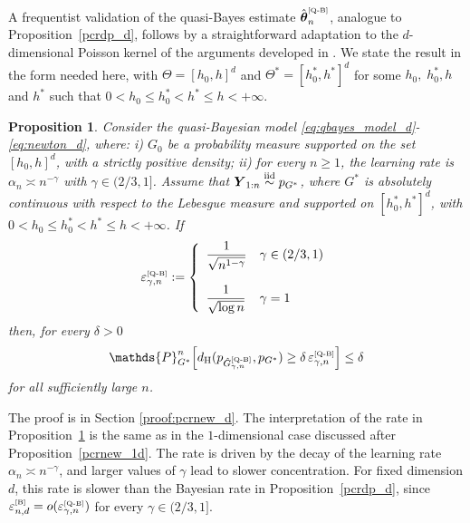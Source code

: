 \documentclass[twoside,12pt]{article}
\def\simiid{\stackrel{\mbox{\scriptsize{iid}}}{\sim}}
\renewcommand{\P}{\mathds{P}}
\newtheorem{prp}[thm]{Proposition}
\begin{document}
A frequentist validation of the quasi-Bayes estimate \(\hat{\boldsymbol\theta}^{\text{\tiny{[Q-B]}}}_{n}\), analogue to Proposition~\ref{pcrdp_d}, follows by a straightforward adaptation to the $d$-dimensional Poisson kernel of the arguments developed in  \citet[{Theorem 4.8 and }Corollary 4.10]{MarTok(09)}.  We state the result in the form needed here, with $\Theta=[{h_0},h]^d$ and $\Theta^{\ast}=[{h_0^\ast},h^{\ast}]^d$ for some ${h_0,\;h_0^\ast,h}$ and $h^{\ast}$ such that  $0<h_0\leq h_0^*<h^\ast\leq h<+\infty$.


\begin{prp}\label{pcrnew_d}
Consider the quasi-Bayesian model \eqref{eq:qbayes_model_d}-\eqref{eq:newton_d}, where: i) $G_0$ be a probability measure supported on the set $[h_0,h]^d$, with a strictly positive density; ii) for every $n\geq 1$, the learning rate is $\alpha_n\asymp n^{-\gamma}$ with $\gamma\in(2/3,1]$. Assume that $\boldsymbol{Y}_{1:n}\simiid p_{G^\ast}$, where $G^{\ast}$  is absolutely continuous with respect to the Lebesgue measure and supported on $[h_0^\ast,h^\ast]^d$, with $0<h_0\leq h_0^\ast<h^\ast\leq h<+\infty$. If
\begin{displaymath}
\varepsilon_{\gamma,n}^{\text{\tiny{[Q-B]}}}:=\left\{
\begin{array}{ll}
\dfrac{1}{\sqrt{n^{1-\gamma}}} &\gamma \in (2/3,1)\\
\\
\dfrac{1}{\sqrt{\log n}}&\gamma=1
\end{array}
\right.
\end{displaymath}
then, for every $\delta>0$
\begin{equation}\label{pcr_newton}
\P_{G^\ast}^n\!\left[d_{\mathrm H}(p_{\hat{G}_{\gamma,n}^{\text{\tiny{[Q-B]}}}},p_{G^\ast})\ge \delta\, \varepsilon_{\gamma,n}^{\text{\tiny{[Q-B]}}}\right]\le\delta
\end{equation}
for all sufficiently large $n$.
\end{prp}


The proof is in Section \ref{proof:pcrnew_d}. The interpretation of the rate in Proposition~\ref{pcrnew_d} is the same as in the $1$-dimensional case discussed after Proposition~\ref{pcrnew_1d}. The rate is driven by the decay of the learning rate $\alpha_n\asymp n^{-\gamma}$, and larger values of $\gamma$ lead to slower concentration. For fixed dimension $d$, this rate is slower than the Bayesian rate in Proposition~\ref{pcrdp_d}, since $\varepsilon_{n,d}^{\text{\tiny{[B]}}} = o(\varepsilon_{\gamma,n}^{\text{\tiny{[Q-B]}}})$ for every $\gamma\in(2/3,1]$.
\end{document}
